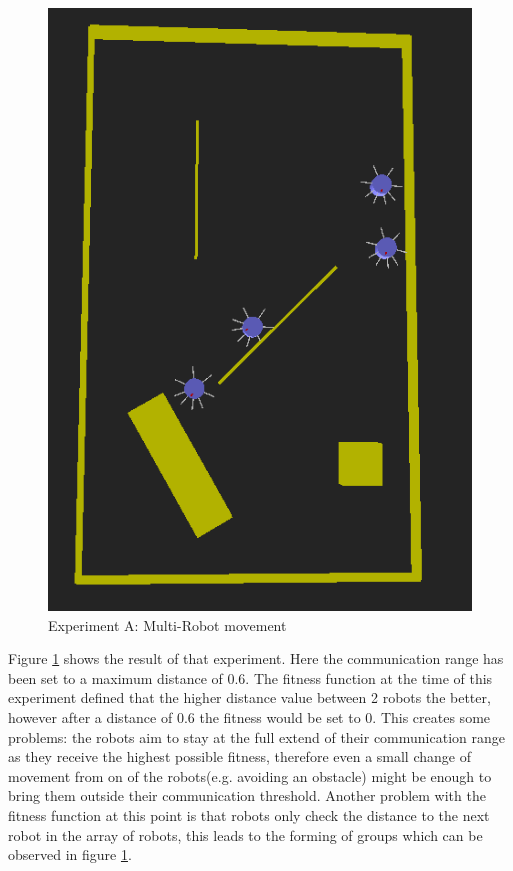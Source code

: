 \begin{figure}[h]
\centering
\includegraphics[scale=0.5]{Chapter4/images/experiment_A.png}
\caption{Experiment A: Multi-Robot movement}
\label{fig:experiment_a}
\end{figure}

Figure \ref{fig:experiment_a} shows the result of that experiment. 
Here the communication range has been set to a maximum distance of 0.6. 
The fitness function at the time of this experiment defined that the higher distance value between 2 robots the better, however after a distance of 0.6 the fitness would be set to 0.
This creates some problems: the robots aim to stay at the full extend of their communication range as they receive the highest possible fitness, therefore even a small change of movement from on of the robots(e.g. avoiding an obstacle) might be enough to bring them outside their communication threshold. 
Another problem with the fitness function at this point is that robots only check the distance to the next robot in the array of robots, this leads to the forming of groups which can be observed in figure \ref{fig:experiment_a}. \\


